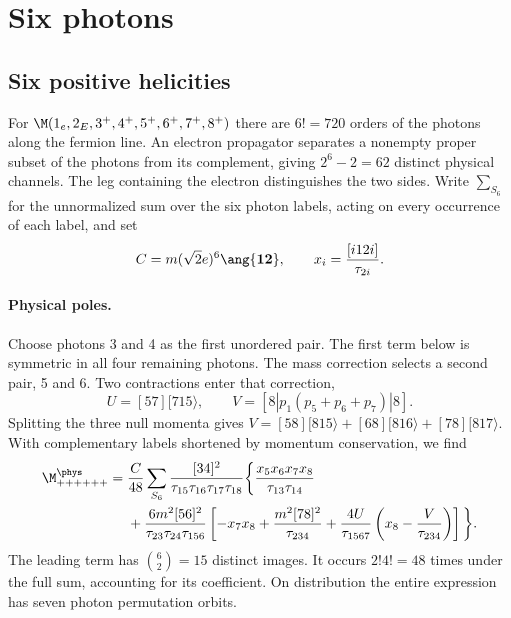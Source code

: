 \section{Six photons}\label{sec:eight-point}
\subsection{Six positive helicities}
For $\M(1_e,2_E,3^+,4^+,5^+,6^+,7^+,8^+)$ there are $6!=720$
orders of the photons along the fermion line. An electron propagator
separates a nonempty proper subset of the photons from its complement,
giving $2^6-2=62$ distinct physical channels. The leg containing the
electron distinguishes the two sides. Write $\sum_{S_6}$ for the
unnormalized sum over the six photon labels, acting on every occurrence
of each label, and set
\[
 C=m(\sqrt{2}e)^6\ang{\mathbf1\mathbf2},\qquad
 x_i=\frac{[i12i]}{\tau_{2i}} .
\]

\paragraph{Physical poles.}
Choose photons 3 and 4 as the first unordered pair. The first term
below is symmetric in all four remaining photons. The mass correction
selects a second pair, 5 and 6. Two contractions enter that correction,
\[
 U=[57][715\rangle,\qquad
 V=[8|p_1(p_5+p_6+p_7)|8].
\]
Splitting the three null momenta gives
$V=[58][815\rangle+[68][816\rangle+[78][817\rangle$.
With complementary labels shortened by momentum conservation, we find
\begin{equation}\label{eq:eight-physical}
\begin{aligned}
 \M_{++++++}^{\phys}={}&\frac{C}{48}\sum_{S_6}
 \frac{[34]^2}{\tau_{15}\tau_{16}\tau_{17}\tau_{18}}
 \bigg\{\frac{x_5 x_6 x_7 x_8}{\tau_{13}\tau_{14}}\\
 &+\frac{6m^2[56]^2}{\tau_{23}\tau_{24}\tau_{156}}
 \left[-x_7x_8+\frac{m^2[78]^2}{\tau_{234}}
 +\frac{4U}{\tau_{1567}}\left(x_8-\frac{V}{\tau_{234}}\right)\right]\bigg\}.
\end{aligned}
\end{equation}
The leading term has $\binom62=15$ distinct images.
It occurs $2!4!=48$ times under the full sum, accounting for its
coefficient. On distribution the entire expression has seven photon
permutation orbits.

